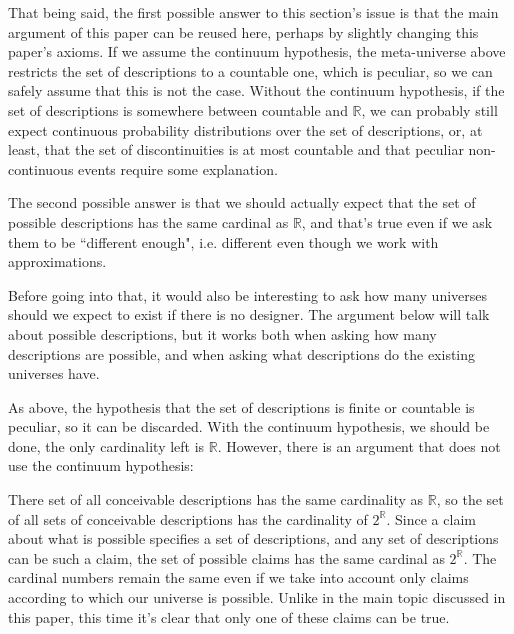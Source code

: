 \documentclass[a4paper
,draft
]{article}
\def\reale{\mathbb{R}}
\newcommand{\paper}[1]{paper}
\newcommand{\ghilimele}[1]{``#1"}
\begin{document}
That being said, the first possible answer to this section's issue
is that the main argument of this \paper{} can be reused here,
perhaps by slightly changing this \paper{}'s
axioms.
If we assume the continuum hypothesis, the meta-universe
above restricts the set of descriptions to a countable one, which is peculiar,
so we can safely assume that this is not the case.
Without the continuum hypothesis, if the set of descriptions is somewhere
between countable and $\reale$, we can probably still expect continuous
probability distributions over the set of descriptions, or, at least,
that the set of discontinuities is at most countable and that peculiar
non-continuous events require some explanation.

The second possible answer is that we should actually expect that the set of
possible descriptions has the same cardinal as $\reale$, and that's true even
if we ask them to be \ghilimele{different enough},
i.e. different even though we work
with approximations.

Before going into that, it would also be interesting to ask
how many universes should we expect to exist if there is no designer. The
argument below will talk about possible descriptions,
but it works both when asking how many descriptions are possible, and
when asking what descriptions do the existing universes have.

As above, the hypothesis that the set of descriptions is finite or countable
is peculiar, so it can be discarded.
With the continuum hypothesis, we should be done, the only cardinality left
is $\reale$.
However, there is an argument that does not use the continuum hypothesis:

There set of all conceivable descriptions has the same cardinality as $\reale$,
so the set of all sets of conceivable descriptions
has the cardinality of $2^\reale$.
Since a claim about what is possible specifies a set of descriptions, and any
set of descriptions can be such a claim,
the set of possible claims has the same cardinal as $2^\reale$.
The cardinal numbers remain the same even if we take into account only claims
according to which our universe is possible.
Unlike in the main topic discussed in this
\paper{}, this time it's clear that only one of these claims can be true.

\end{document}

